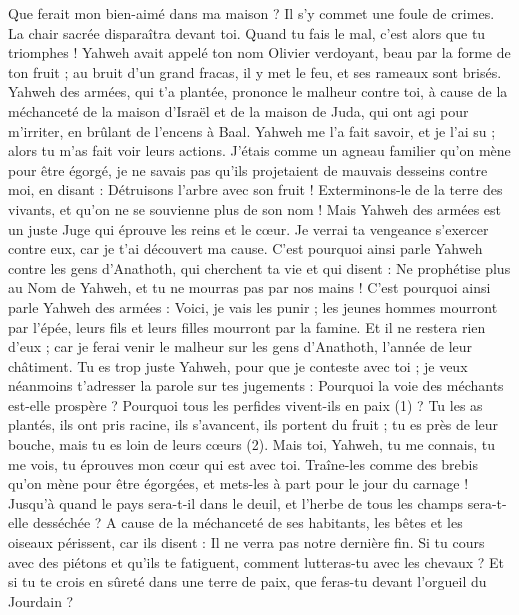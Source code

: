 \begin{multicols}{2}
Que ferait mon bien-aimé dans ma maison ? Il s’y commet une foule de crimes. La chair sacrée disparaîtra devant toi. Quand tu fais le mal, c’est alors que tu triomphes !
Yahweh avait appelé ton nom Olivier verdoyant, beau par la forme de ton fruit ; au bruit d'un grand fracas, il y met le feu, et ses rameaux sont brisés.
Yahweh des armées, qui t'a plantée, prononce le malheur contre toi, à cause de la méchanceté de la maison d'Israël et de la maison de Juda, qui ont agi pour m'irriter, en brûlant de l’encens à Baal.
Yahweh me l'a fait savoir, et je l'ai su ; alors tu m'as fait voir leurs actions.
J’étais comme un agneau familier qu’on mène pour être égorgé, je ne savais pas qu'ils projetaient de mauvais desseins contre moi, en disant : Détruisons l'arbre avec son fruit ! Exterminons-le de la terre des vivants, et qu'on ne se souvienne plus de son nom !
Mais Yahweh des armées est un juste Juge qui éprouve les reins et le cœur. Je verrai ta vengeance s’exercer contre eux, car je t’ai découvert ma cause.
C'est pourquoi ainsi parle Yahweh contre les gens d’Anathoth, qui cherchent ta vie et qui disent : Ne prophétise plus au Nom de Yahweh, et tu ne mourras pas par nos mains !
C'est pourquoi ainsi parle Yahweh des armées : Voici, je vais les punir ; les jeunes hommes mourront par l'épée, leurs fils et leurs filles mourront par la famine.
Et il ne restera rien d'eux ; car je ferai venir le malheur sur les gens d’Anathoth, l'année de leur châtiment.
\VerseOne{}Tu es trop juste Yahweh, pour que je conteste avec toi ; je veux néanmoins t’adresser la parole sur tes jugements : Pourquoi la voie des méchants est-elle prospère ? Pourquoi tous les perfides vivent-ils en paix\FTNT{} (1) ?
Tu les as plantés, ils ont pris racine, ils s'avancent, ils portent du fruit ; tu es près de leur bouche, mais tu es loin de leurs cœurs\FTNT{} (2).
Mais toi, Yahweh, tu me connais, tu me vois, tu éprouves mon cœur qui est avec toi. Traîne-les comme des brebis qu'on mène pour être égorgées, et mets-les à part pour le jour du carnage !
Jusqu’à quand le pays sera-t-il dans le deuil, et l'herbe de tous les champs sera-t-elle desséchée ? A cause de la méchanceté de ses habitants, les bêtes et les oiseaux périssent, car ils disent : Il ne verra pas notre dernière fin.
Si tu cours avec des piétons et qu'ils te fatiguent, comment lutteras-tu avec les chevaux ? Et si tu te crois en sûreté dans une terre de paix, que feras-tu devant l’orgueil du Jourdain ?

\end{multicols}
